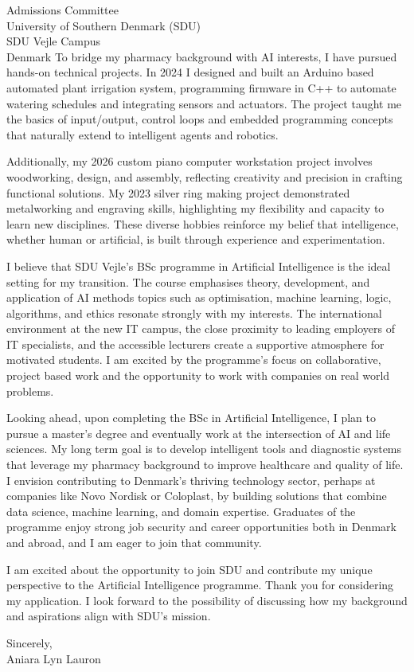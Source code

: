 \documentclass[11pt,a4paper]{letter}
\begin{document}
\begin{letter}{Admissions Committee \\ University of Southern Denmark (SDU) \\ SDU Vejle Campus \\ Denmark}
To bridge my pharmacy background with AI interests, I have pursued hands-on technical projects. In 2024 I designed and built an Arduino based automated plant irrigation system, programming firmware in C++ to automate watering schedules and integrating sensors and actuators. The project taught me the basics of input/output, control loops and embedded programming concepts that naturally extend to intelligent agents and robotics.

Additionally, my 2026 custom piano computer workstation project involves woodworking, design, and assembly, reflecting creativity and precision in crafting functional solutions. My 2023 silver ring making project demonstrated metalworking and engraving skills, highlighting my flexibility and capacity to learn new disciplines. These diverse hobbies reinforce my belief that intelligence, whether human or artificial, is built through experience and experimentation.

I believe that SDU Vejle's BSc programme in Artificial Intelligence is the ideal setting for my transition. The course emphasises theory, development, and application of AI methods topics such as optimisation, machine learning, logic, algorithms, and ethics resonate strongly with my interests. The international environment at the new IT campus, the close proximity to leading employers of IT specialists, and the accessible lecturers create a supportive atmosphere for motivated students. I am excited by the programme's focus on collaborative, project based work and the opportunity to work with companies on real world problems.

Looking ahead, upon completing the BSc in Artificial Intelligence, I plan to pursue a master's degree and eventually work at the intersection of AI and life sciences. My long term goal is to develop intelligent tools and diagnostic systems that leverage my pharmacy background to improve healthcare and quality of life. I envision contributing to Denmark's thriving technology sector, perhaps at companies like Novo Nordisk or Coloplast, by building solutions that combine data science, machine learning, and domain expertise. Graduates of the programme enjoy strong job security and career opportunities both in Denmark and abroad, and I am eager to join that community.

I am excited about the opportunity to join SDU and contribute my unique perspective to the Artificial Intelligence programme. Thank you for considering my application. I look forward to the possibility of discussing how my background and aspirations align with SDU's mission.

\closing{Sincerely, \\
Aniara Lyn Lauron}

\end{letter}
\end{document}
